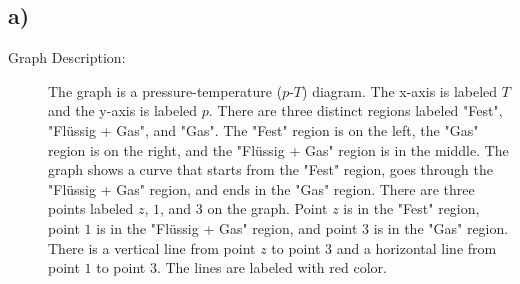 

\subsection*{a)}

\begin{description}
    \item[Graph Description:] The graph is a pressure-temperature ($p$-$T$) diagram. The x-axis is labeled $T$ and the y-axis is labeled $p$. There are three distinct regions labeled "Fest", "Flüssig + Gas", and "Gas". The "Fest" region is on the left, the "Gas" region is on the right, and the "Flüssig + Gas" region is in the middle. The graph shows a curve that starts from the "Fest" region, goes through the "Flüssig + Gas" region, and ends in the "Gas" region. There are three points labeled $z$, $1$, and $3$ on the graph. Point $z$ is in the "Fest" region, point $1$ is in the "Flüssig + Gas" region, and point $3$ is in the "Gas" region. There is a vertical line from point $z$ to point $3$ and a horizontal line from point $1$ to point $3$. The lines are labeled with red color.
\end{description}
